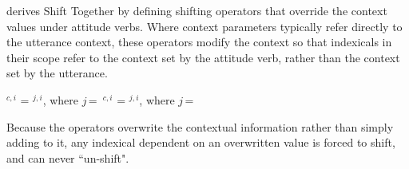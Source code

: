 \documentclass[output=paper]{langscibook}
\begin{document}
\begin{exe}
\end{exe}

\citet{Anand2006} derives Shift Together by defining shifting operators that override the context values under attitude verbs. Where context parameters typically refer directly to the utterance context, these operators modify the context so that indexicals in their scope refer to the context set by the attitude verb, rather than the context set by the utterance.
\begin{exe}
	\ex\label{authshift} $^{c,i}$ = \den{$\alpha$}$^{j,i}$, where $j$\,=\,
	\ex {}$^{c,i}$ = \den{$\alpha$}$^{j,i}$, where $j$\,=\,
\end{exe}
Because the operators overwrite the contextual information rather than simply adding to it, any indexical dependent on an overwritten value is forced to shift, and can never ``un-shift".
\end{document}
